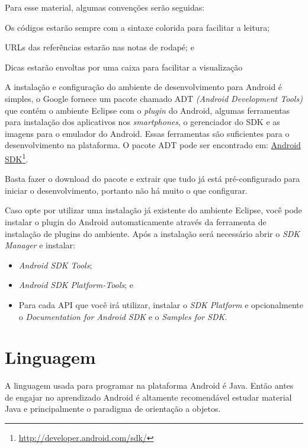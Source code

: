 \documentclass[a4paper,12pt,brazil]{book}
\begin{document}
 Para esse material, algumas convenções serão seguidas: 
 \bi
 \item
Os códigos estarão sempre com a sintaxe colorida para facilitar a leitura;
\item
URLs das referências estarão nas notas de rodapé; e
\item
 Dicas estarão envoltas por uma caixa para facilitar a visualização
\ei


A instalação e configuração do ambiente de desenvolvimento para Android é simples, o Google fornece um pacote chamado ADT \emph{(Android Development Tools)} que contém o ambiente Eclipse com o \emph{plugin} do Android, algumas ferramentas para instalação dos aplicativos nos \emph{smartphones}, o gerenciador do SDK e as imagens para o emulador do Android. Essas ferramentas são suficientes para o desenvolvimento na plataforma.
O pacote ADT pode ser encontrado em: \href{http://developer.android.com/sdk/}{Android SDK}\footnote{\href{http://developer.android.com/sdk/}{http://developer.android.com/sdk/}}. 

Basta fazer o download do pacote e extrair que tudo já está pré-configurado para iniciar o desenvolvimento, portanto não há muito o que configurar.

Caso opte por utilizar uma instalação já existente do ambiente Eclipse, você pode instalar o plugin do Android automaticamente através da ferramenta de instalação de plugins do ambiente. Após a instalação será necessário abrir o \emph{SDK Manager} e instalar:
\begin{itemize}[noitemsep, nolistsep]
\item \emph{Android SDK Tools};
\item \emph{Android SDK Platform-Tools}; e
\item Para cada API que você irá utilizar, instalar o \emph{SDK Platform} e opcionalmente o \emph{Documentation for Android SDK} e o \emph{Samples for SDK}.
\end{itemize}

\section{Linguagem}
A linguagem usada para programar na plataforma Android é Java. Então antes de engajar no aprendizado Android é altamente recomendável estudar material Java e principalmente o paradigma de orientação a objetos.
\end{document}
